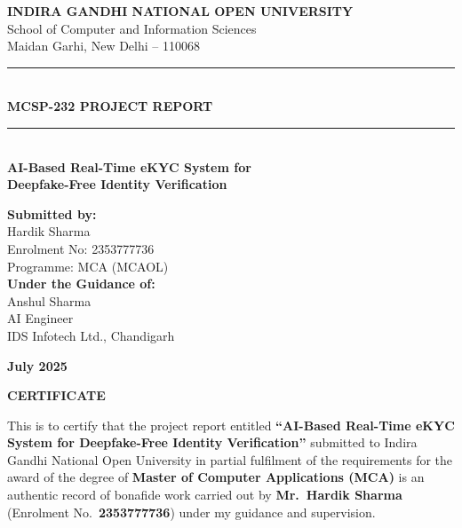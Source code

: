 \documentclass[12pt,a4paper]{report}
\begin{document}
\begin{titlepage}
    \centering
    \vspace*{0.5cm}

    {\Large \textbf{INDIRA GANDHI NATIONAL OPEN UNIVERSITY}}\\[0.3cm]
    {\large School of Computer and Information Sciences}\\[0.2cm]
    {\large Maidan Garhi, New Delhi -- 110068}\\[1cm]

    \rule{\textwidth}{1.5pt}\\[0.4cm]
    {\LARGE \textbf{MCSP-232 PROJECT REPORT}}\\[0.4cm]
    \rule{\textwidth}{1.5pt}\\[1.2cm]

    {\LARGE \textbf{AI-Based Real-Time eKYC System for\\[0.3cm]
    Deepfake-Free Identity Verification}}\\[2cm]

    \begin{flushleft}
    \large
    \textbf{Submitted by:}\\[0.2cm]
    Hardik Sharma\\
    Enrolment No: 2353777736\\
    Programme: MCA (MCAOL)\\[0.8cm]

    \textbf{Under the Guidance of:}\\[0.2cm]
    Anshul Sharma\\
    AI Engineer\\
    IDS Infotech Ltd., Chandigarh\\[1cm]
    \end{flushleft}

    \vfill
    {\large \textbf{July 2025}}

\end{titlepage}

\newpage
\thispagestyle{empty}
\begin{center}
    {\Large \textbf{CERTIFICATE}}
\end{center}
\vspace{1cm}

This is to certify that the project report entitled \textbf{``AI-Based Real-Time eKYC System for Deepfake-Free Identity Verification''} submitted to Indira Gandhi National Open University in partial fulfilment of the requirements for the award of the degree of \textbf{Master of Computer Applications (MCA)} is an authentic record of bonafide work carried out by \textbf{Mr.~Hardik Sharma} (Enrolment No.~\textbf{2353777736}) under my guidance and supervision.
\end{document}

